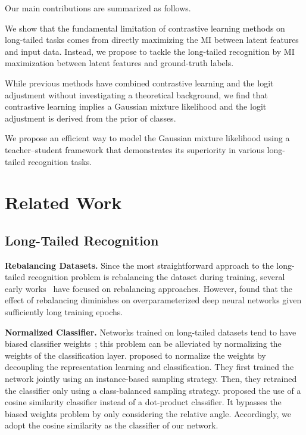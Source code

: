 \documentclass{article}
\theoremstyle{plain}
\theoremstyle{definition}
\theoremstyle{remark}
\begin{document}
Our main contributions are summarized as follows.
\begin{compactitem}
    \item We show that the fundamental limitation of contrastive learning methods on long-tailed tasks comes from directly maximizing the MI between latent features and input data. Instead, we propose to tackle the long-tailed recognition by MI maximization between latent features and ground-truth labels.
    \item While previous methods have combined contrastive learning and the logit adjustment without investigating a theoretical background, we find that contrastive learning implies a Gaussian mixture likelihood and the logit adjustment is derived from the prior of classes.
    \item We propose an efficient way to model the Gaussian mixture likelihood using a teacher--student framework that demonstrates its superiority in various long-tailed recognition tasks.
\end{compactitem} \section{Related Work}
\subsection{Long-Tailed Recognition}
\textbf{Rebalancing Datasets.} Since the most straightforward approach to the long-tailed recognition problem is rebalancing the dataset during training, several early works~\cite{chawla2002smote,japkowicz2002class,drummond2003c4,han2005borderline,he2009learning,mikolov2013distributed} have focused on rebalancing approaches. 
However, \citet{byrd2019effect} found that the effect of rebalancing diminishes on overparameterized deep neural networks given sufficiently long training epochs.


\textbf{Normalized Classifier.} Networks trained on long-tailed datasets tend to have biased classifier weights~\cite{alshammari2022long}; this problem can be alleviated by normalizing the weights of the classification layer. \citet{kang2020decoupling} proposed to normalize the weights by decoupling the representation learning and classification. They first trained the network jointly using an instance-based sampling strategy. Then, they retrained the classifier only using a class-balanced sampling strategy.
\citet{gidaris2018dynamic} proposed the use of a cosine similarity classifier instead of a dot-product classifier. It bypasses the biased weights problem by only considering the relative angle. Accordingly, we adopt the cosine similarity as the classifier of our network.
\end{document}
